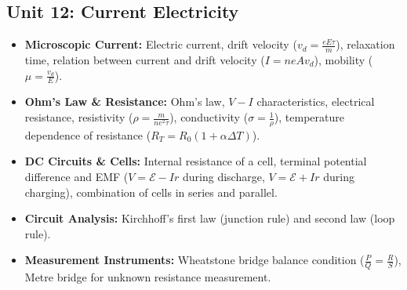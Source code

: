 \documentclass[11pt,a4paper]{article}
\begin{document}
\subsection{Unit 12: Current Electricity}
\begin{itemize}
  \item \textbf{Microscopic Current:} Electric current, drift velocity ($v_d = \frac{eE\tau}{m}$), relaxation time, relation between current and drift velocity ($I = n e A v_d$), mobility ($\mu = \frac{v_d}{E}$).
  \item \textbf{Ohm's Law \& Resistance:} Ohm's law, $V-I$ characteristics, electrical resistance, resistivity ($\rho = \frac{m}{n e^2 \tau}$), conductivity ($\sigma = \frac{1}{\rho}$), temperature dependence of resistance ($R_T = R_0(1+\alpha\Delta T)$).
  \item \textbf{DC Circuits \& Cells:} Internal resistance of a cell, terminal potential difference and EMF ($V = \mathcal{E} - Ir$ during discharge, $V = \mathcal{E} + Ir$ during charging), combination of cells in series and parallel.
  \item \textbf{Circuit Analysis:} Kirchhoff's first law (junction rule) and second law (loop rule).
  \item \textbf{Measurement Instruments:} Wheatstone bridge balance condition ($\frac{P}{Q} = \frac{R}{S}$), Metre bridge for unknown resistance measurement.
\end{itemize}
\end{document}
